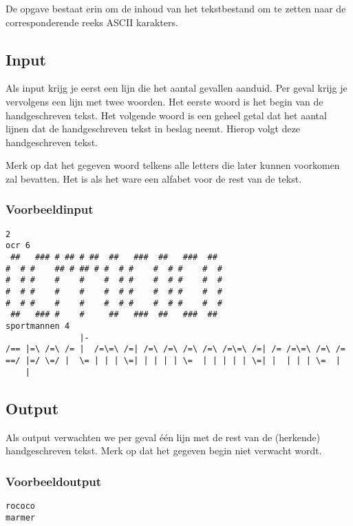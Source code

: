 De opgave bestaat erin om de inhoud van het tekstbestand om te zetten naar de
corresponderende reeks ASCII karakters.

\subsection*{Input}

Als input krijg je eerst een lijn die het aantal gevallen aanduid. Per geval
krijg je vervolgens een lijn met twee woorden. Het eerste woord is het begin van
de handgeschreven tekst. Het volgende woord is een geheel getal dat het aantal
lijnen dat de handgeschreven tekst in beslag neemt. Hierop volgt deze
handgeschreven tekst.

Merk op dat het gegeven woord telkens alle letters die later kunnen voorkomen
zal bevatten. Het is als het ware een alfabet voor de rest van de tekst.

\subsubsection*{Voorbeeldinput}

\begin{verbatim}
2
ocr 6
 ##   ### # ## # ##  ##   ###  ##   ###  ##  
#  # #    ## # ## # #  # #    #  # #    #  # 
#  # #    #    #    #  # #    #  # #    #  # 
#  # #    #    #    #  # #    #  # #    #  # 
#  # #    #    #    #  # #    #  # #    #  # 
 ##   ### #    #     ##   ###  ##   ###  ##  
sportmannen 4
               |-                                                     
/== |=\ /=\ /= |  /=\=\ /=| /=\ /=\ /=\ /=\ /=\=\ /=| /= /=\=\ /=\ /= 
==/ |=/ \=/ |  \= | | | \=| | | | | \=  | | | | | \=| |  | | | \=  |  
    |                                                                 
\end{verbatim}

\subsection*{Output}

Als output verwachten we per geval \'e\'en lijn met de rest van de (herkende)
handgeschreven tekst. Merk op dat het gegeven begin niet verwacht wordt.

\subsubsection*{Voorbeeldoutput}

\begin{verbatim}
rococo
marmer
\end{verbatim}

